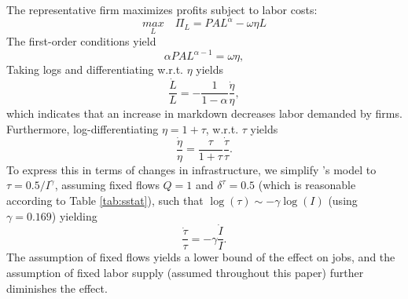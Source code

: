 \documentclass[a4paper]{article}
\begin{document}
\noindent The representative firm maximizes profits subject to labor costs:  
\begin{equation}
\underset{L}{max}\quad \Pi_{L}=PAL^{\alpha}-\omega \eta L
\end{equation}
The first-order conditions yield
\begin{equation}
\alpha PAL^{\alpha-1} = \omega \eta,
\end{equation}
Taking logs and differentiating w.r.t. $\eta$ yields
\begin{equation}
\frac{\dot{L}}{L} = - \frac{1}{1-\alpha} \frac{\dot{\eta}}{\eta},
\end{equation}
which indicates that an increase in markdown decreases labor demanded by firms. Furthermore, log-differentiating $\eta = 1+\tau$, w.r.t. $\tau$ yields
\begin{equation}
\frac{\dot{\eta}}{\eta} = \frac{\tau}{1+\tau}\frac{\dot{\tau}}{\tau}.
\end{equation}
To express this in terms of changes in infrastructure, we simplify \citet{fajgelbaum2020optimal}'s model to $\tau = 0.5 / I^\gamma$, assuming fixed flows $Q = 1$ and $\delta^\tau = 0.5$ (which is reasonable according to Table \ref{tab:sstat}), such that $\log(\tau) \sim - \gamma\log(I)$ (using $\gamma = 0.169$) yielding
\begin{equation}
    \frac{\dot{\tau}}{\tau} = -\gamma\frac{\dot{I}}{I}.
\end{equation}
The assumption of fixed flows yields a lower bound of the effect on jobs, and the assumption of fixed labor supply (assumed throughout this paper) further diminishes the effect. \newline 


\end{document}
